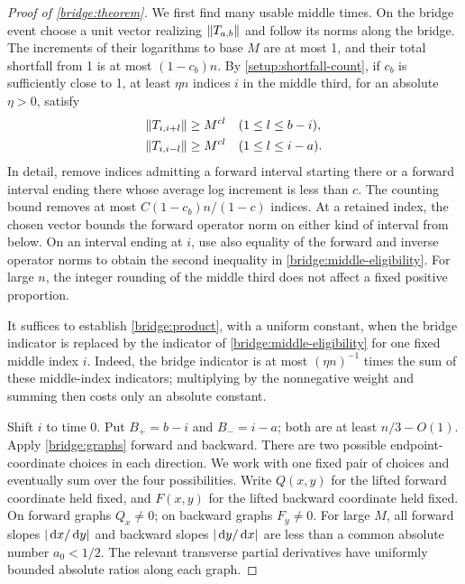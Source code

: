 \begin{proof}[Proof of \cref{bridge:theorem}]
We first find many usable middle times. On the bridge event choose a
unit vector realizing $\left\lVert T_{a,b}\right\rVert$ and follow its norms along the
bridge. The increments of their logarithms to base $M$ are at most 1,
and their total shortfall from 1 is at most $(1-c_b)n$. By
\cref{setup:shortfall-count}, if $c_b$ is sufficiently close to 1,
at least $\eta n$ indices $i$ in the middle third, for an absolute
$\eta>0$, satisfy
\begin{equation}
 \begin{aligned}
 \left\lVert T_{i,i+l}\right\rVert&\geq M^{cl}
       &&(1\leq l\leq b-i),\\
 \left\lVert T_{i,i-l}\right\rVert&\geq M^{cl}
       &&(1\leq l\leq i-a).
 \end{aligned}
 \label{bridge:middle-eligibility}
\end{equation}
In detail, remove indices admitting a forward interval starting there
or a forward interval ending there whose average log increment is
less than $c$. The counting bound removes at most
$C(1-c_b)n/(1-c)$ indices. At a retained index, the chosen vector
bounds the forward operator norm on either kind of interval from
below. On an interval ending at $i$, use also equality of the forward
and inverse operator norms to obtain the second inequality in
\cref{bridge:middle-eligibility}. For large $n$, the integer rounding
of the middle third does not affect a fixed positive proportion.

It suffices to establish \cref{bridge:product}, with a uniform
constant, when the bridge indicator is replaced by the indicator of
\cref{bridge:middle-eligibility} for one fixed middle index $i$.
Indeed, the bridge indicator is at most $(\eta n)^{-1}$ times the
sum of these middle-index indicators; multiplying by the nonnegative
weight and summing then costs only an absolute constant.

Shift $i$ to time 0. Put $B_+=b-i$ and $B_-=i-a$; both are at least
$n/3-O(1)$. Apply \cref{bridge:graphs} forward and backward. There
are two possible endpoint-coordinate choices in each direction.
We work with one fixed pair of choices and eventually sum over the
four possibilities. Write $Q(x,y)$ for the lifted forward coordinate
held fixed, and $F(x,y)$ for the lifted backward coordinate held
fixed. On forward graphs $Q_x\ne0$; on backward graphs $F_y\ne0$.
For large $M$, all forward slopes $\left\lvert\,\mathrm{d} x/\,\mathrm{d} y\right\rvert$ and backward
slopes $\left\lvert\,\mathrm{d} y/\,\mathrm{d} x\right\rvert$ are less than a common absolute number
$a_0<1/2$. The relevant transverse partial derivatives have uniformly
bounded absolute ratios along each graph.


\end{proof}
